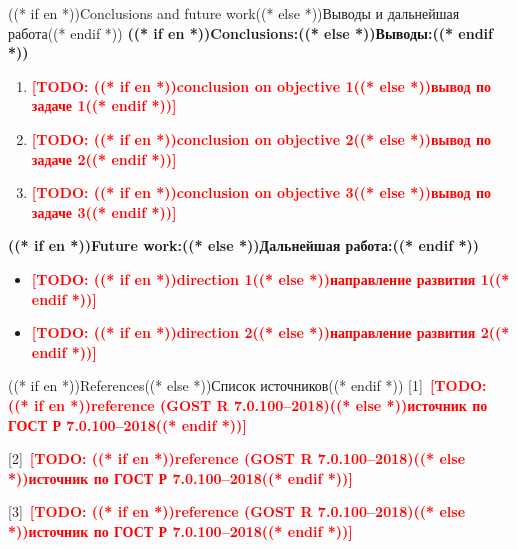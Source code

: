 \documentclass[aspectratio=169, 14pt]{beamer}
\newcommand{\todo}[1]{\textcolor{red}{\textbf{[TODO: #1]}}}
\begin{document}
\begin{frame}{((* if en *))Conclusions and future work((* else *))Выводы и дальнейшая работа((* endif *))}
  {\color{hseblue}\textbf{((* if en *))Conclusions:((* else *))Выводы:((* endif *))}}
  \begin{enumerate}
    \item \todo{((* if en *))conclusion on objective 1((* else *))вывод по задаче 1((* endif *))}
    \item \todo{((* if en *))conclusion on objective 2((* else *))вывод по задаче 2((* endif *))}
    \item \todo{((* if en *))conclusion on objective 3((* else *))вывод по задаче 3((* endif *))}
  \end{enumerate}

  \vspace{0.4em}
  {\color{hseblue}\textbf{((* if en *))Future work:((* else *))Дальнейшая работа:((* endif *))}}
  \begin{itemize}
    \item \todo{((* if en *))direction 1((* else *))направление развития 1((* endif *))}
    \item \todo{((* if en *))direction 2((* else *))направление развития 2((* endif *))}
  \end{itemize}
\end{frame}

\begin{frame}{((* if en *))References((* else *))Список источников((* endif *))}
  \small\setlength{\parskip}{0.5em}%
  [1]~\todo{((* if en *))reference (GOST R 7.0.100--2018)((* else *))источник по ГОСТ Р 7.0.100--2018((* endif *))}

  [2]~\todo{((* if en *))reference (GOST R 7.0.100--2018)((* else *))источник по ГОСТ Р 7.0.100--2018((* endif *))}

  [3]~\todo{((* if en *))reference (GOST R 7.0.100--2018)((* else *))источник по ГОСТ Р 7.0.100--2018((* endif *))}
\end{frame}
\end{document}
